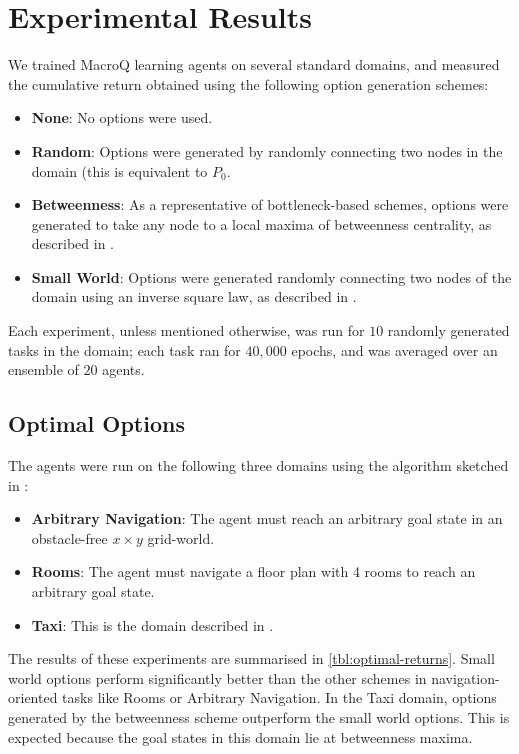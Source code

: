\section{Experimental Results}
\label{sec:experiments}

We trained MacroQ learning agents on several standard domains, and
measured the cumulative return obtained using the following option
generation schemes: 
\begin{itemize}
   \item \textbf{None}: No options were used.
   \item \textbf{Random}: Options were generated by randomly connecting
     two nodes in the domain (this is equivalent to $P_0$.
   \item \textbf{Betweenness}: As a representative of bottleneck-based
     schemes, options were generated to take any node to a local maxima
     of betweenness centrality, as described in \cite{Simsek2008}. 
   \item \textbf{Small World}: Options were generated randomly
     connecting two nodes of the domain using an inverse square law, as
     described in .
\end{itemize}

Each experiment, unless mentioned otherwise, was run for $10$ randomly
generated tasks in the domain; each task ran for $40,000$ epochs, and
was averaged over an ensemble of $20$ agents.

\subsection{Optimal Options}
The agents were run on the following three domains using the algorithm
sketched in :
\begin{itemize}
   \item \textbf{Arbitrary Navigation}: The agent must reach an
     arbitrary goal state in an obstacle-free $x \times y$ grid-world. 
   \item \textbf{Rooms}: The agent must navigate a floor plan with
     4 rooms to reach an arbitrary goal state.
   \item \textbf{Taxi}: This is the domain described in
     .
\end{itemize}

The results of these experiments are summarised in
\autoref{tbl:optimal-returns}. Small world options perform significantly
better than the other schemes in navigation-oriented tasks like Rooms or
Arbitrary Navigation. In the Taxi domain, options generated by the
betweenness scheme outperform the small world options. This is expected
because the goal states in this domain lie at betweenness maxima.

